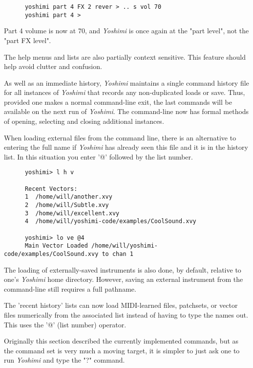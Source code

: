    \begin{verbatim}
      yoshimi part 4 FX 2 rever > .. s vol 70
      yoshimi part 4 >
   \end{verbatim}

   Part 4 volume is now at 70, and \textsl{Yoshimi} is once again at the
   "part level", not the "part FX level".

   The help menus and lists are also partially context sensitive. This
   feature should help avoid clutter and confusion.

   As well as an immediate history, \textsl{Yoshimi} maintains a single command
   history file for all instances of \textsl{Yoshimi} that records any
   non-duplicated loads or save.  Thus, provided one makes a normal
   command-line exit, the last commands will be available on the next run of
   \textsl{Yoshimi}.
   The command-line now has formal methods of opening, selecting and closing
   additional instances.

   When loading external files from the command line, there is an alternative
   to entering the full name if \textsl{Yoshimi} has already seen this file and
   it is in the history list. In this situation you enter '@' followed by the
   list number.

   \begin{verbatim}
      yoshimi> l h v

      Recent Vectors:
      1  /home/will/another.xvy
      2  /home/will/Subtle.xvy
      3  /home/will/excellent.xvy
      4  /home/will/yoshimi-code/examples/CoolSound.xvy

      yoshimi> lo ve @4
      Main Vector Loaded /home/will/yoshimi-code/examples/CoolSound.xvy to chan 1
   \end{verbatim}

   The loading of externally-saved instruments is also done, by default,
   relative to one's \textsl{Yoshimi} home directory.  However, saving an
   external instrument from the command-line still requires a full pathname.

   The 'recent history' lists can now load MIDI-learned files, patchsets, or
   vector files numerically from the associated list instead of having to type
   the names out.  This uses the '@' (list number) operator.

   Originally this section described the currently implemented commands,
   but as the command set is very much a moving target, it is simpler to just
   ask one to run \textsl{Yoshimi} and type the "?" command.

